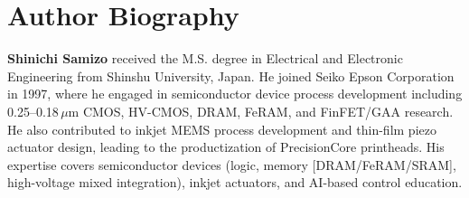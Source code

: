 \documentclass[journal]{IEEEtran}
\begin{document}
\section*{Author Biography}
\textbf{Shinichi Samizo} received the M.S. degree in Electrical and Electronic Engineering from Shinshu University, Japan.  
He joined Seiko Epson Corporation in 1997, where he engaged in semiconductor device process development including 0.25--0.18\,$\mu$m CMOS, HV-CMOS, DRAM, FeRAM, and FinFET/GAA research.  
He also contributed to inkjet MEMS process development and thin-film piezo actuator design, leading to the productization of PrecisionCore printheads.  
His expertise covers semiconductor devices (logic, memory [DRAM/FeRAM/SRAM], high-voltage mixed integration), inkjet actuators, and AI-based control education.
\end{document}
